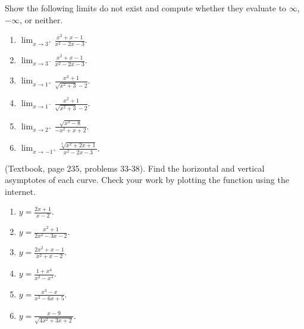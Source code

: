 \begin{problem}
Show the following limits do not exist and compute whether they evaluate to $\infty $, $-\infty$, or neither. 
\begin{multicols}{3}
\begin{enumerate}
\item $\displaystyle\lim_{x\to 3^+} \frac{x^{2}+x-1}{x^2-2x-3} $.
\item $\displaystyle\lim_{x\to 3^-} \frac{x^{2}+x-1}{x^2-2x-3} $.
\item $\displaystyle\lim_{x\to 1^+} \frac{x^2+1}{\sqrt{x^2+3 }-2} $.
\item $\displaystyle\lim_{x\to 1^-} \frac{x^2+1}{\sqrt{x^2+3 }-2} $.
\item $\displaystyle\lim_{x\to 2^+} \frac{\sqrt{x^3-8}}{ -x^2+x+2} $.
\item $\displaystyle\lim_{x\to -1^+} \frac{\sqrt[3]{x^2+2x+1}}{ x^2-2x-3} $.

\end{enumerate}
\end{multicols}
\end{problem}


\begin{problem}(Textbook, page 235, problems 33-38).
Find the horizontal and vertical asymptotes of each curve. Check your work by plotting the function using the internet.
\begin{multicols}{2}
\begin{enumerate}
\item $y=\frac{2x+1}{x-2}$.
\item $y=\frac{x^2+1}{2x^2-3x-2}$.
\item $y=\frac{2x^2+x-1}{x^2+x-2}$.
\item $y=\frac{1+x^4}{x^2-x^4}$.
\item $y=\frac{x^3-x}{x^2-6x+5}$.
\item $y=\frac{x-9}{\sqrt{4x^2+3x+2}}$.
\end{enumerate}
\end{multicols}
\end{problem}


